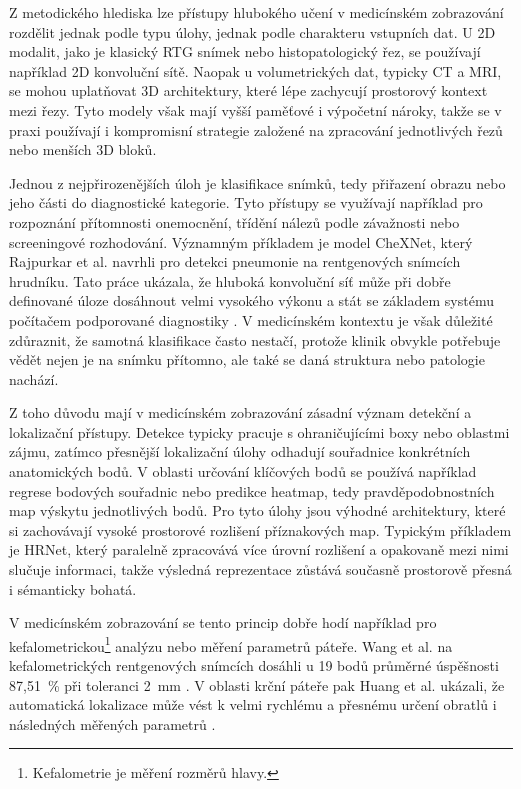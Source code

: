 \documentclass[male,czech,api_bc]{kitheses}
\begin{document}
Z metodického hlediska lze přístupy hlubokého učení v medicínském zobrazování rozdělit jednak podle typu úlohy, jednak podle charakteru vstupních dat. U 2D modalit, jako je klasický RTG snímek nebo histopatologický řez, se používají například 2D konvoluční sítě. Naopak u volumetrických dat, typicky CT a MRI, se mohou uplatňovat 3D architektury, které lépe zachycují prostorový kontext mezi řezy. Tyto modely však mají vyšší paměťové i výpočetní nároky, takže se v praxi používají i kompromisní strategie založené na zpracování jednotlivých řezů nebo menších 3D bloků.\cite{Shen2017,Cicek2016,Hatamizadeh2022UNETR}

Jednou z nejpřirozenějších úloh je klasifikace snímků, tedy přiřazení obrazu nebo jeho části do diagnostické kategorie. Tyto přístupy se využívají například pro rozpoznání přítomnosti onemocnění, třídění nálezů podle závažnosti nebo screeningové rozhodování. Významným příkladem je model CheXNet, který Rajpurkar et al. navrhli pro detekci pneumonie na rentgenových snímcích hrudníku. Tato práce ukázala, že hluboká konvoluční síť může při dobře definované úloze dosáhnout velmi vysokého výkonu a stát se základem systému počítačem podporované diagnostiky \cite{Rajpurkar2017}. V medicínském kontextu je však důležité zdůraznit, že samotná klasifikace často nestačí, protože klinik obvykle potřebuje vědět nejen  je na snímku přítomno, ale také  se daná struktura nebo patologie nachází.

Z toho důvodu mají v medicínském zobrazování zásadní význam detekční a lokalizační přístupy. Detekce typicky pracuje s ohraničujícími boxy nebo oblastmi zájmu, zatímco přesnější lokalizační úlohy odhadují souřadnice konkrétních anatomických bodů. V oblasti určování klíčových bodů se používá například regrese bodových souřadnic nebo predikce heatmap, tedy pravděpodobnostních map výskytu jednotlivých bodů. Pro tyto úlohy jsou výhodné architektury, které si zachovávají vysoké prostorové rozlišení příznakových map. Typickým příkladem je HRNet, který paralelně zpracovává více úrovní rozlišení a opakovaně mezi nimi slučuje informaci, takže výsledná reprezentace zůstává současně prostorově přesná i sémanticky bohatá.\cite{Wang2021} 

V medicínském zobrazování se tento princip dobře hodí například pro kefalometrickou\footnote{Kefalometrie je měření rozměrů hlavy.} analýzu nebo měření parametrů páteře. Wang et al. na kefalometrických rentgenových snímcích dosáhli u 19 bodů průměrné úspěšnosti 87{,}51~\% při toleranci 2~mm \cite{Wang2021Ceph}. V oblasti krční páteře pak Huang et al. ukázali, že automatická lokalizace může vést k velmi rychlému a přesnému určení obratlů i následných měřených parametrů \cite{Huang2025}.
\end{document}
